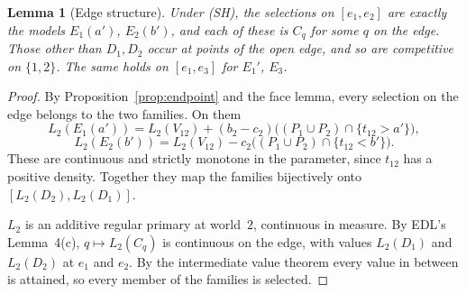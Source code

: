 \documentclass[11pt]{article}
\newtheorem{lemma}[theorem]{Lemma}
\theoremstyle{definition}\newtheorem{definition}[theorem]{Definition}
\theoremstyle{remark}\newtheorem{remark}[theorem]{Remark}
\begin{document}
\begin{lemma}[Edge structure]\label{lem:edges}
Under (SH), the selections on $[e_1,e_2]$ are exactly the models $E_1(a')$,
$E_2(b')$, and each of these is $C_q$ for some $q$ on the edge. Those other
than $D_1,D_2$ occur at points of the open edge, and so are competitive on
$\{1,2\}$. The same holds on $[e_1,e_3]$ for $E_1'$, $E_3$.
\end{lemma}
\begin{proof}
By Proposition~\ref{prop:endpoint} and the face lemma, every selection on the
edge belongs to the two families. On them
\[
 L_2(E_1(a'))=L_2(V_{12})+(b_2-c_2)\bigl((P_1\cup P_2)\cap\{t_{12}>a'\}\bigr),
\]
\[
 L_2(E_2(b'))=L_2(V_{12})-c_2\bigl((P_1\cup P_2)\cap\{t_{12}<b'\}\bigr).
\]
These are continuous and strictly monotone in the parameter, since $t_{12}$
has a positive density. Together they map the families bijectively onto
$[L_2(D_2),L_2(D_1)]$.

$L_2$ is an additive regular primary at world~$2$, continuous in measure. By
EDL's Lemma~4(c), $q\mapsto L_2(C_q)$ is continuous on the edge, with values
$L_2(D_1)$ and $L_2(D_2)$ at $e_1$ and $e_2$. By the intermediate value
theorem every value in between is attained, so every member of the families
is selected.
\end{proof}
\end{document}
